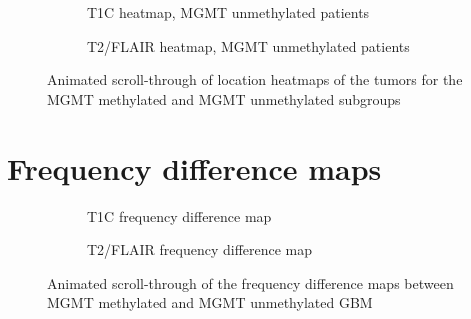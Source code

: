 \begin{subappendices}
\begin{figure}[H]
        \begin{subfigure}[t]{0.4\textwidth}
            \centering
            \caption{\acrshort{T1C} heatmap, \acrshort{MGMT} unmethylated patients}\label{fig:HGG_loc_T1_heatmap_unmethylated}
        \end{subfigure}
        \hfill
        \begin{subfigure}[t]{0.4\textwidth}
            \centering
            \caption{\acrshort{T2}/\acrshort{FLAIR} heatmap, \acrshort{MGMT} unmethylated patients}\label{fig:HGG_loc_T2_heatmap_unmethylated}
        \end{subfigure}
        \caption{Animated scroll-through of location heatmaps of the \glspl{tumor} for the MGMT methylated and MGMT unmethylated subgroups}\label{fig:HGG_local_heatmaps_subgroups}
    \end{figure}


    \newpage
    \section{Frequency difference maps}
    \begin{figure}[H]
    \centering
    \begin{subfigure}[t]{0.4\textwidth}
        \centering
        \caption{\gls{T1C} frequency difference map}\label{fig:HGG_loc_T1_freq_dif_gif}
    \end{subfigure}
    \hfill
    \begin{subfigure}[t]{0.4\textwidth}
        \centering
        \caption{\gls{T2}/\gls{FLAIR} frequency difference map}\label{fig:HGG_loc_T2_freq_dif_gif}
    \end{subfigure}
    \caption{Animated scroll-through of the frequency difference maps between \gls{MGMT} methylated and \gls{MGMT} unmethylated \gls{GBM}}\label{fig:HGG_loc_freq_map_full}
    \end{figure}


    \newpage

\end{subappendices}
